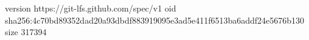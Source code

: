 version https://git-lfs.github.com/spec/v1
oid sha256:4c70bd89352dad20a93dbdf883919095e3ad5e411f6513ba6addf24e5676b130
size 317394
